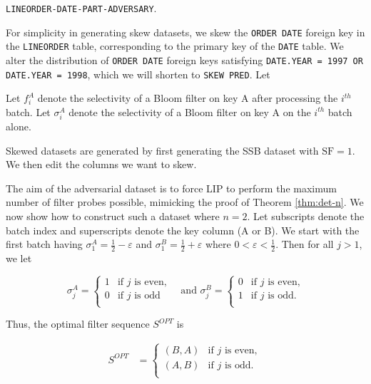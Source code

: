 \texttt{LINEORDER-DATE-PART-ADVERSARY}.

For simplicity in generating skew datasets, we skew the \texttt{ORDER DATE} foreign key in the \texttt{LINEORDER} table, corresponding to the primary key of the \texttt{DATE} table. 
We alter the distribution of \texttt{ORDER DATE} foreign keys satisfying \texttt{DATE.YEAR = 1997 OR DATE.YEAR = 1998}, which we will shorten to \texttt{SKEW PRED}.
Let 








Let $f_i^A$ denote the selectivity of a Bloom filter on key A after processing the $i^{th}$ batch. 
Let $\sigma_i^A$ denote the selectivity of a Bloom filter on key A on the $i^{th}$ batch alone. 






Skewed datasets are generated by first generating the SSB dataset with $\text{SF} = 1$.
We then edit the columns we want to skew. 

The aim of the adversarial dataset is to force LIP to perform the maximum number of filter probes possible, mimicking the proof of Theorem \ref{thm:det-n}.
We now show how to construct such a dataset where $n = 2$.
Let subscripts denote the batch index and superscripts denote the key column (A or B).
We start with the first batch having
$\sigma_1^A = \frac{1}{2} - \varepsilon$ and $\sigma_1^B = \frac{1}{2} + \varepsilon$ where $0 < \varepsilon < \frac{1}{2}$. Then for all $j > 1$, we let

\begin{equation*}
\sigma_j^A = 
    \begin{cases}
    1 & \text{if $j$ is even,} \\[0.5em]
    0 & \text{if $j$ is odd} \\
    \end{cases} \quad \text{and }
\sigma_j^B = 
    \begin{cases}
    0 & \text{if $j$ is even,} \\[0.5em]
    1 &  \text{if $j$ is odd}. \\
    \end{cases}
\end{equation*}

Thus, the optimal filter sequence $S^{OPT}$ is 

\begin{align*}
S^{OPT} &= 
    \begin{cases}
    (B, A) & \text{if $j$ is even}, \\[0.5em]
    (A, B) & \text{if $j$ is odd}. \\
    \end{cases}\\[0.5em]
\end{align*}

